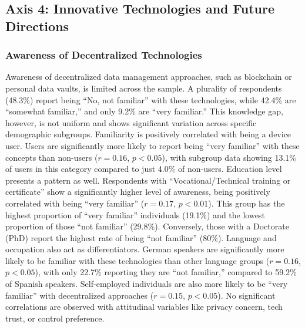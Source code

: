 \subsection{Axis 4: Innovative Technologies and Future Directions}
	\subsubsection{Awareness of Decentralized Technologies}
		Awareness of decentralized data management approaches, such as blockchain or personal data vaults, is limited across the sample. A plurality of respondents (48.3\%) report being “No, not familiar” with these technologies, while 42.4\% are “somewhat familiar,” and only 9.2\% are “very familiar.” This knowledge gap, however, is not uniform and shows significant variation across specific demographic subgroups.
		Familiarity is positively correlated with being a device user. Users are significantly more likely to report being “very familiar” with these concepts than non-users ($r = 0.16$, $p < 0.05$), with subgroup data showing 13.1\% of users in this category compared to just 4.0\% of non-users.
		Education level presents a pattern as well. Respondents with “Vocational/Technical training or certificate” show a significantly higher level of awareness, being positively correlated with being “very familiar” ($r = 0.17$, $p < 0.01$). This group has the highest proportion of “very familiar” individuals (19.1\%) and the lowest proportion of those “not familiar” (29.8\%). Conversely, those with a Doctorate (PhD) report the highest rate of being “not familiar” (80\%).
		Language and occupation also act as differentiators. German speakers are significantly more likely to be familiar with these technologies than other language groups ($r = 0.16$, $p < 0.05$), with only 22.7\% reporting they are “not familiar,” compared to 59.2\% of Spanish speakers. Self-employed individuals are also more likely to be “very familiar” with decentralized approaches ($r = 0.15$, $p < 0.05$). No significant correlations are observed with attitudinal variables like privacy concern, tech trust, or control preference.
